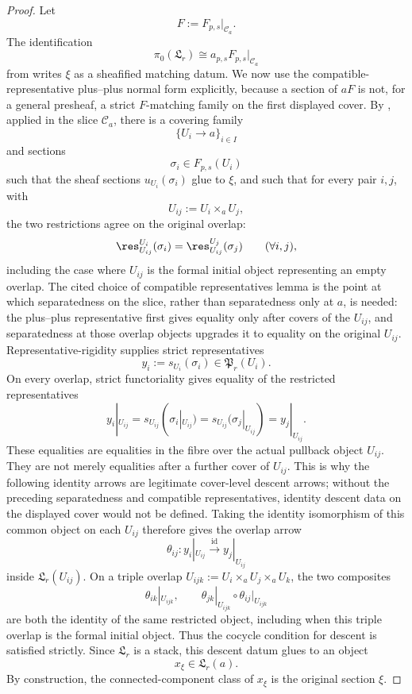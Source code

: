\begin{proof}
Let
\[
F:=F_{p,s}|_{\mathcal C_a}.
\]
The identification
\[
\pi_0(\mathfrak L_r)\cong a_{p,s}F_{p,s}|_{\mathcal C_a}
\]
from  writes $\xi$ as a sheafified
matching datum. We now use the compatible-representative plus--plus normal form
explicitly, because a section of \(aF\) is not, for a general presheaf, a
strict \(F\)-matching family on the first displayed cover. By
, applied in the slice
\(\mathcal C_a\), there is a
covering family
\[
\{U_i\to a\}_{i\in I}
\]
and sections
\[
\sigma_i\in F_{p,s}(U_i)
\]
such that the sheaf sections \(u_{U_i}(\sigma_i)\) glue to \(\xi\), and
such that for every pair \(i,j\), with
\[
U_{ij}:=U_i\times_a U_j,
\]
the two restrictions agree on the original overlap:
\[
\res_{U_{ij}}^{U_i}(\sigma_i)
=
\res_{U_{ij}}^{U_j}(\sigma_j)
\qquad(\forall i,j),
\]
including the case where \(U_{ij}\) is the formal initial object
representing an empty overlap. The cited choice of compatible representatives lemma is the
point at which separatedness on the slice, rather than separatedness only at
\(a\), is needed: the plus--plus representative first gives equality only
after covers of the \(U_{ij}\), and separatedness at those overlap objects
upgrades it to equality on the original \(U_{ij}\).
Representative-rigidity supplies strict representatives
\[
y_i:=s_{U_i}(\sigma_i)\in\mathfrak P_r(U_i).
\]
On every overlap, strict functoriality gives equality of the restricted
representatives
\[
y_i|_{U_{ij}}=s_{U_{ij}}(\sigma_i|_{U_{ij}})
=s_{U_{ij}}(\sigma_j|_{U_{ij}})=y_j|_{U_{ij}}.
\]
These equalities are equalities in the fibre over the actual pullback
object \(U_{ij}\). They are not merely equalities after a further cover of
\(U_{ij}\). This is why the following identity arrows are legitimate
cover-level descent arrows; without the preceding separatedness and
compatible representatives, identity descent data on the displayed cover would not be
defined.
Taking the identity isomorphism of this common object on each
$U_{ij}$ therefore gives the overlap arrow
\[
\theta_{ij}:y_i|_{U_{ij}}\xrightarrow{\mathrm{id}}y_j|_{U_{ij}}
\]
inside $\mathfrak L_r(U_{ij})$. On a triple overlap
$U_{ijk}:=U_i\times_aU_j\times_aU_k$, the two composites
\[
\theta_{ik}|_{U_{ijk}},
\qquad
\theta_{jk}|_{U_{ijk}}\circ\theta_{ij}|_{U_{ijk}}
\]
are both the identity of the same restricted object, including when this
triple overlap is the formal initial object. Thus the cocycle condition
for descent is satisfied strictly. Since $\mathfrak L_r$ is a stack,
this descent datum glues to an object
\[
x_\xi\in\mathfrak L_r(a).
\]
By construction, the connected-component class of $x_\xi$ is the original
section $\xi$.
\end{proof}

